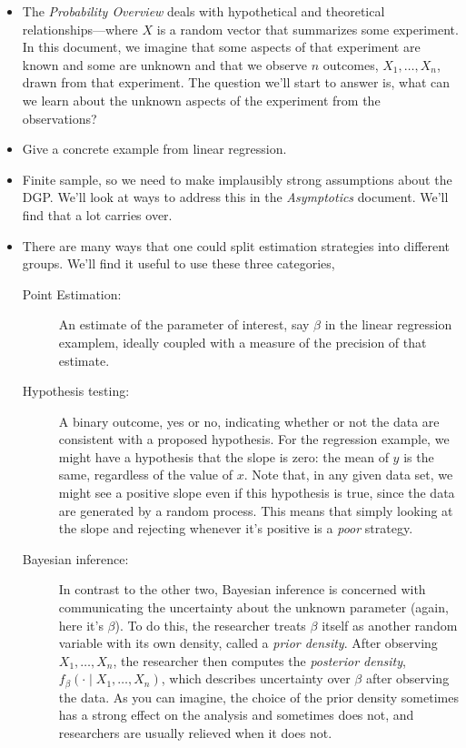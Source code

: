 \begin{itemize}

\item The \emph{Probability Overview} deals with hypothetical and
  theoretical relationships---where $X$ is a random vector that
  summarizes some experiment.  In this document, we imagine that some
  aspects of that experiment are known and some are unknown and that
  we observe $n$ outcomes, $X_1,\dots,X_n$, drawn from that experiment.
  The question we'll start to answer is, what can we learn about the
  unknown aspects of the experiment from the observations?

\item Give a concrete example from linear regression.

\item Finite sample, so we need to make implausibly strong assumptions
  about the DGP.  We'll look at ways to address this in the
  \emph{Asymptotics} document.  We'll find that a lot carries over.

\item There are many ways that one could split estimation strategies
  into different groups.  We'll find it useful to use these three
  categories,
  \begin{description}
  \item[Point Estimation:] An estimate of the parameter of interest,
    say $\beta$ in the linear regression examplem, ideally coupled with a
    measure of the precision of that estimate.

  \item[Hypothesis testing:] A binary outcome, yes or no, indicating
    whether or not the data are consistent with a proposed
    hypothesis.  For the regression example, we might have a
    hypothesis that the slope is zero: the mean of $y$ is the same,
    regardless of the value of $x$.  Note that, in any given data set,
    we might see a positive slope even if this hypothesis is true,
    since the data are generated by a random process.  This means that
    simply looking at the slope and rejecting whenever it's positive
    is a \emph{poor} strategy.

  \item[Bayesian inference:] In contrast to the other two, Bayesian
    inference is concerned with communicating the uncertainty about
    the unknown parameter (again, here it's $\beta$).  To do this, the
    researcher treats $\beta$ itself as another random variable with its
    own density, called a \emph{prior density}.  After observing
    $X_1,\dots,X_n$, the researcher then computes the \emph{posterior
      density}, $f_\beta(\cdot \mid X_1,\dots,X_n)$, which describes
    uncertainty over $\beta$ after observing the data.  As you can
    imagine, the choice of the prior density sometimes has a strong
    effect on the analysis and sometimes does not, and researchers are
    usually relieved when it does not.


\end{description}
\end{itemize}
